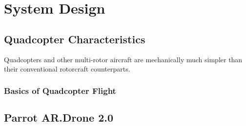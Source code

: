 
\chapter{System Design\label{ch:system}}

\section{Quadcopter Characteristics}

Quadcopters and other multi-rotor aircraft are mechanically much simpler than their conventional rotorcraft counterparts. 

\subsection{Basics of Quadcopter Flight}

\section{Parrot AR.Drone 2.0}

